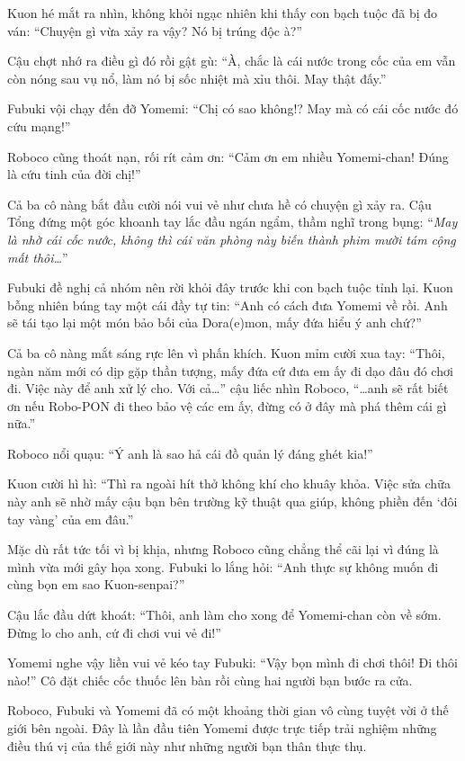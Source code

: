 \documentclass[../main.tex]{subfiles}
\begin{document}
Kuon hé mắt ra nhìn, không khỏi ngạc nhiên khi thấy con bạch tuộc đã bị đo ván: ``Chuyện gì vừa xảy ra vậy? Nó bị trúng độc à?''

Cậu chợt nhớ ra điều gì đó rồi gật gù: ``À, chắc là cái nước trong cốc của em vẫn còn nóng sau vụ nổ, làm nó bị sốc nhiệt mà xỉu thôi. May thật đấy.''

Fubuki vội chạy đến đỡ Yomemi: ``Chị có sao không!? May mà có cái cốc nước đó cứu mạng!''

Roboco cũng thoát nạn, rối rít cảm ơn: ``Cảm ơn em nhiều Yomemi-chan! Đúng là cứu tinh của đời chị!''

Cả ba cô nàng bắt đầu cười nói vui vẻ như chưa hề có chuyện gì xảy ra. Cậu Tổng đứng một góc khoanh tay lắc đầu ngán ngẩm, thầm nghĩ trong bụng: ``\textit{May là nhờ cái cốc nước, không thì cái văn phòng này biến thành phim mười tám cộng mất thôi\dots}''

Fubuki đề nghị cả nhóm nên rời khỏi đây trước khi con bạch tuộc tỉnh lại. Kuon bỗng nhiên búng tay một cái đầy tự tin: ``Anh có cách đưa Yomemi về rồi. Anh sẽ tái tạo lại một món bảo bối của Dora(e)mon, mấy đứa hiểu ý anh chứ?''

Cả ba cô nàng mắt sáng rực lên vì phấn khích. Kuon mỉm cười xua tay: ``Thôi, ngàn năm mới có dịp gặp thần tượng, mấy đứa cứ đưa em ấy đi dạo đâu đó chơi đi. Việc này để anh xử lý cho. Với cả\dots'' cậu liếc nhìn Roboco, ``\dots anh sẽ rất biết ơn nếu Robo-PON đi theo bảo vệ các em ấy, đừng có ở đây mà phá thêm cái gì nữa.''

Roboco nổi quạu: ``Ý anh là sao hả cái đồ quản lý đáng ghét kia!''

Kuon cười hì hì: ``Thì ra ngoài hít thở không khí cho khuây khỏa. Việc sửa chữa này anh sẽ nhờ mấy cậu bạn bên trường kỹ thuật qua giúp, không phiền đến `đôi tay vàng' của em đâu.''

Mặc dù rất tức tối vì bị khịa, nhưng Roboco cũng chẳng thể cãi lại vì đúng là mình vừa mới gây họa xong. Fubuki lo lắng hỏi: ``Anh thực sự không muốn đi cùng bọn em sao Kuon-senpai?''

Cậu lắc đầu dứt khoát: ``Thôi, anh làm cho xong để Yomemi-chan còn về sớm. Đừng lo cho anh, cứ đi chơi vui vẻ đi!''

Yomemi nghe vậy liền vui vẻ kéo tay Fubuki: ``Vậy bọn mình đi chơi thôi! Đi thôi nào!'' Cô đặt chiếc cốc thuốc lên bàn rồi cùng hai người bạn bước ra cửa.

\ct

Roboco, Fubuki và Yomemi đã có một khoảng thời gian vô cùng tuyệt vời ở thế giới bên ngoài. Đây là lần đầu tiên Yomemi được trực tiếp trải nghiệm những điều thú vị của thế giới này như những người bạn thân thực thụ.
\end{document}

